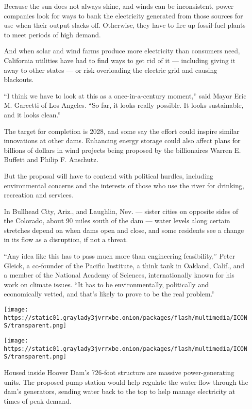 Because the sun does not always shine, and winds can be inconsistent,
power companies look for ways to bank the electricity generated from
those sources for use when their output slacks off. Otherwise, they have
to fire up fossil-fuel plants to meet periods of high demand.

And when solar and wind farms produce more electricity than consumers
need, California utilities have had to find ways to get rid of it ---
including giving it away to other states --- or risk overloading the
electric grid and causing blackouts.

``I think we have to look at this as a once-in-a-century moment,'' said
Mayor Eric M. Garcetti of Los Angeles. ``So far, it looks really
possible. It looks sustainable, and it looks clean.''

The target for completion is 2028, and some say the effort could inspire
similar innovations at other dams. Enhancing energy storage could also
affect plans for billions of dollars in wind projects being proposed by
the billionaires Warren E. Buffett and Philip F. Anschutz.

But the proposal will have to contend with political hurdles, including
environmental concerns and the interests of those who use the river for
drinking, recreation and services.

In Bullhead City, Ariz., and Laughlin, Nev. --- sister cities on
opposite sides of the Colorado, about 90 miles south of the dam ---
water levels along certain stretches depend on when dams open and close,
and some residents see a change in its flow as a disruption, if not a
threat.

``Any idea like this has to pass much more than engineering
feasibility,'' Peter Gleick, a co-founder of the Pacific Institute, a
think tank in Oakland, Calif., and a member of the National Academy of
Sciences, internationally known for his work on climate issues. ``It has
to be environmentally, politically and economically vetted, and that's
likely to prove to be the real problem.''

\texttt{[image: https://static01.graylady3jvrrxbe.onion/packages/flash/multimedia/ICONS/transparent.png]}

\texttt{[image: https://static01.graylady3jvrrxbe.onion/packages/flash/multimedia/ICONS/transparent.png]}

Housed inside Hoover Dam's 726-foot structure are massive
power-generating units. The proposed pump station would help regulate
the water flow through the dam's generators, sending water back to the
top to help manage electricity at times of peak demand.

